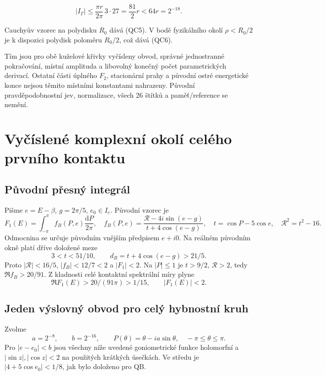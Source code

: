 \documentclass[11pt,a4paper]{article}
\theoremstyle{remark}\newtheorem{remark}[theorem]{Poznámka}
\numberwithin{equation}{section}
\begin{document}
\[
|I_\Gamma|
\le\frac{\pi r}{2\pi}\,3\cdot27
=\frac{81}{2}r<64r=2^{-18}.
\tag{QC23}
\]

Cauchyův vzorec na polydisku \(R_0\) dává (QC5). V bodě fyzikálního
okolí \(\rho<R_0/2\) je k dispozici polydisk poloměru \(R_0/2\), což
dává (QC6).

Tím jsou pro obě kuželové křivky vyčísleny obvod, správné jednostranné
pokračování, místní amplituda a libovolný konečný počet parametrických
derivací. Ostatní části úplného \(F_2\), stacionární prahy a původní
ostré energetické konce nejsou těmito místními konstantami nahrazeny.
Původní pravděpodobnostní jev, normalizace, všech 26 štítků a
paměť/reference se nemění.

\section{Vyčíslené komplexní okolí celého prvního kontaktu}
\hypertarget{pux16fvodnuxed-pux159esnuxfd-integruxe1l}{%
\subsection{Původní přesný
integrál}\label{pux16fvodnuxed-pux159esnuxfd-integruxe1l}}

Pišme \(e=E-\beta\), \(g=2\pi/5\), \(e_0\in I_e\). Původní vzorec je \[
F_1(E)=\int_{-\pi}^{\pi} f_B(P,e)\frac{\mathrm dP}{2\pi},
\quad
f_B(P,e)=\frac{\mathcal R-4i\sin(e-g)}
{t+4\cos(e-g)},
\quad
t=\cos P-5\cos e,\quad \mathcal R^2=t^2-16.
\tag{FQ1}
\] Odmocnina se určuje původním vnějším předpisem \(e+i0\). Na reálném
původním okně platí dříve doložené meze \[
3<t<51/10,\qquad d_B=t+4\cos(e-g)>21/5.
\] Proto \(|\mathcal R|<16/5\), \(|f_B|<12/7<2\) a \(|F_1|<2\). Na
\(|P|\le1\) je \(t>9/2\), \(\mathcal R>2\), tedy \(\Re f_B>20/91\). Z
kladnosti celé kontaktní spektrální míry plyne \[
\boxed{\Re F_1(E)>20/(91\pi)>1/15,\qquad |F_1(E)|<2.}
\tag{FQ2}
\]

\hypertarget{jeden-vuxfdslovnuxfd-obvod-pro-celuxfd-hybnostnuxed-kruh}{%
\subsection{Jeden výslovný obvod pro celý hybnostní
kruh}\label{jeden-vuxfdslovnuxfd-obvod-pro-celuxfd-hybnostnuxed-kruh}}

Zvolme \[
a=2^{-8},\qquad b=2^{-16},\qquad
P(\theta)=\theta-ia\sin\theta,\quad -\pi\le\theta\le\pi.
\tag{FQ3}
\] Pro \(|e-e_0|<b\) jsou všechny níže uvedené goniometrické funkce
holomorfní a \(|\sin z|,|\cos z|<2\) na použitých krátkých úsečkách. Ve
středu je \(|4+5\cos e_0|<1/8\), jak bylo doloženo pro QB.
\end{document}
